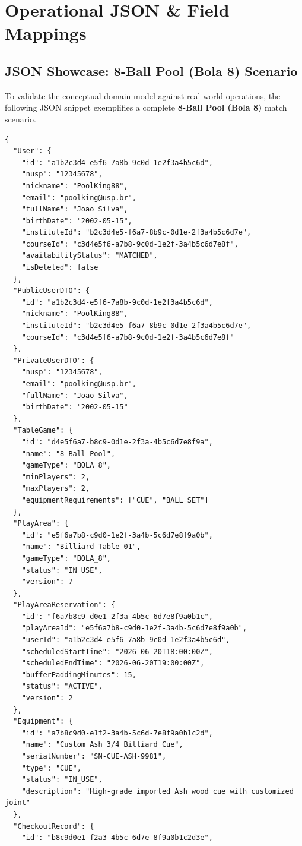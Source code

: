 \documentclass[11pt,a4paper]{report}
\begin{document}
\chapter{Operational JSON \& Field Mappings}

\section{JSON Showcase: 8-Ball Pool (Bola 8) Scenario}
To validate the conceptual domain model against real-world operations, the following JSON snippet exemplifies a complete \textbf{8-Ball Pool (Bola 8)} match scenario.

\begin{lstlisting}[caption={Bola 8 Conceptual JSON Instance}]
{
  "User": {
    "id": "a1b2c3d4-e5f6-7a8b-9c0d-1e2f3a4b5c6d",
    "nusp": "12345678",
    "nickname": "PoolKing88",
    "email": "poolking@usp.br",
    "fullName": "Joao Silva",
    "birthDate": "2002-05-15",
    "instituteId": "b2c3d4e5-f6a7-8b9c-0d1e-2f3a4b5c6d7e",
    "courseId": "c3d4e5f6-a7b8-9c0d-1e2f-3a4b5c6d7e8f",
    "availabilityStatus": "MATCHED",
    "isDeleted": false
  },
  "PublicUserDTO": {
    "id": "a1b2c3d4-e5f6-7a8b-9c0d-1e2f3a4b5c6d",
    "nickname": "PoolKing88",
    "instituteId": "b2c3d4e5-f6a7-8b9c-0d1e-2f3a4b5c6d7e",
    "courseId": "c3d4e5f6-a7b8-9c0d-1e2f-3a4b5c6d7e8f"
  },
  "PrivateUserDTO": {
    "nusp": "12345678",
    "email": "poolking@usp.br",
    "fullName": "Joao Silva",
    "birthDate": "2002-05-15"
  },
  "TableGame": {
    "id": "d4e5f6a7-b8c9-0d1e-2f3a-4b5c6d7e8f9a",
    "name": "8-Ball Pool",
    "gameType": "BOLA_8",
    "minPlayers": 2,
    "maxPlayers": 2,
    "equipmentRequirements": ["CUE", "BALL_SET"]
  },
  "PlayArea": {
    "id": "e5f6a7b8-c9d0-1e2f-3a4b-5c6d7e8f9a0b",
    "name": "Billiard Table 01",
    "gameType": "BOLA_8",
    "status": "IN_USE",
    "version": 7
  },
  "PlayAreaReservation": {
    "id": "f6a7b8c9-d0e1-2f3a-4b5c-6d7e8f9a0b1c",
    "playAreaId": "e5f6a7b8-c9d0-1e2f-3a4b-5c6d7e8f9a0b",
    "userId": "a1b2c3d4-e5f6-7a8b-9c0d-1e2f3a4b5c6d",
    "scheduledStartTime": "2026-06-20T18:00:00Z",
    "scheduledEndTime": "2026-06-20T19:00:00Z",
    "bufferPaddingMinutes": 15,
    "status": "ACTIVE",
    "version": 2
  },
  "Equipment": {
    "id": "a7b8c9d0-e1f2-3a4b-5c6d-7e8f9a0b1c2d",
    "name": "Custom Ash 3/4 Billiard Cue",
    "serialNumber": "SN-CUE-ASH-9981",
    "type": "CUE",
    "status": "IN_USE",
    "description": "High-grade imported Ash wood cue with customized joint"
  },
  "CheckoutRecord": {
    "id": "b8c9d0e1-f2a3-4b5c-6d7e-8f9a0b1c2d3e",

\end{lstlisting}
\end{document}
